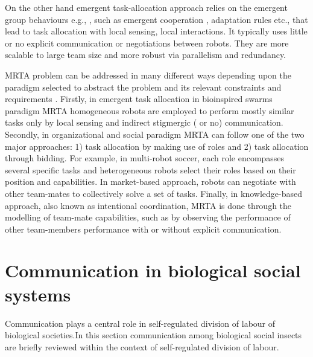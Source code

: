 On the other hand emergent task-allocation approach relies on the emergent group behaviours e.g., \cite{Kube+1993}, such as emergent cooperation \cite{Lerman+2006}, adaptation rules \cite{Liu+2007} etc., that lead to task allocation with local sensing, local interactions. It typically uses little or no explicit communication or negotiations between robots. They are more scalable to large team size and more robust via parallelism and redundancy.

MRTA problem can be addressed in many different ways depending upon the paradigm selected to abstract the problem and its relevant constraints and requirements \cite{Parker2008}. Firstly, in emergent task allocation in bioinspired swarms paradigm MRTA homogeneous robots are employed to perform mostly similar tasks only by local sensing and indirect stigmergic ( or no) communication. Secondly, in organizational and social paradigm MRTA can follow one of the two major approaches: 1) task allocation by making use of roles and 2) task allocation through bidding. For example, in multi-robot soccer, each role encompasses several specific tasks and heterogeneous robots select their roles based on their position and capabilities. In market-based approach, robots can negotiate with other team-mates to collectively solve a set of tasks. Finally, in knowledge-based approach, also known as intentional coordination, MRTA is done through the modelling of team-mate capabilities, such as by observing the performance of other team-members performance with or without explicit communication.
\section{Communication in biological social systems}
\label{bg:comm-biology}
Communication plays a central role in self-regulated division of labour of biological societies.In this section communication among biological social insects are briefly reviewed within the context of self-regulated  division of labour.

